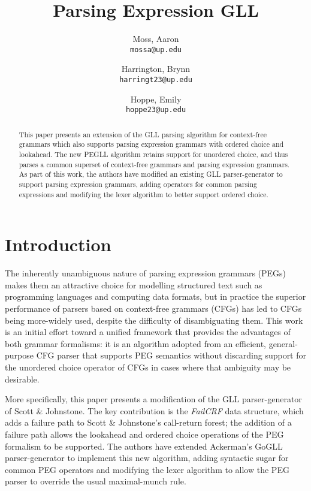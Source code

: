 \documentclass{article}
\title{Parsing Expression GLL}
\author{
    Moss, Aaron\\
    \texttt{mossa@up.edu}
    \and
    Harrington, Brynn\\
    \texttt{harringt23@up.edu}
    \and
    Hoppe, Emily\\
    \texttt{hoppe23@up.edu}
}
\begin{document}
\maketitle

\begin{abstract}
This paper presents an extension of the GLL parsing algorithm for context-free grammars which also supports parsing expression grammars with ordered choice and lookahead. 
The new PEGLL algorithm retains support for unordered choice, and thus parses a common superset of context-free grammars and parsing expression grammars. 
As part of this work, the authors have modified an existing GLL parser-generator to support parsing expression grammars, adding operators for common parsing expressions and modifying the lexer algorithm to better support ordered choice. 
\end{abstract}

\section{Introduction}
The inherently unambiguous nature of parsing expression grammars (PEGs) makes them an attractive choice for modelling structured text such as programming languages and computing data formats, but in practice the superior performance of parsers based on context-free grammars (CFGs) has led to CFGs being more-widely used, despite the difficulty of disambiguating them. 
This work is an initial effort toward a unified framework that provides the advantages of both grammar formalisms: it is an algorithm adopted from an efficient, general-purpose CFG parser that supports PEG semantics without discarding support for the unordered choice operator of CFGs in cases where that ambiguity may be desirable. 

More specifically, this paper presents a modification of the GLL parser-generator of Scott \& Johnstone\cite{SJ10,SJ16}. 
The key contribution is the \emph{FailCRF} data structure, which adds a failure path to Scott \& Johnstone's call-return forest; the addition of a failure path allows the lookahead and ordered choice operations of the PEG formalism to be supported.
The authors have extended Ackerman's GoGLL\cite{Ack19} parser-generator to implement this new algorithm, adding syntactic sugar for common PEG operators and modifying the lexer algorithm to allow the PEG parser to override the usual maximal-munch rule. 
\end{document}
